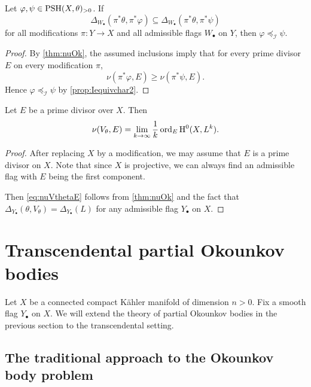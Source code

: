 \begin{corollary}\label{cor:Deltacontimplyvarphi}
	Let $\varphi,\psi\in \mathrm{PSH}(X,\theta)_{>0}$. If
	\[
		\Delta_{W_{\bullet}}(\pi^*\theta,\pi^*\varphi)\subseteq \Delta_{W_{\bullet}}(\pi^*\theta,\pi^*\psi)
	\]
	for all modifications $\pi\colon Y\rightarrow X$ and all admissible flags $W_{\bullet}$ on $Y$, then $\varphi\preceq_{\mathcal{I}} \psi$.
\end{corollary}
\begin{proof}
    By \cref{thm:nuOk}, the assumed inclusions imply that for every prime divisor $E$ on every modification $\pi$,
    \[
    \nu(\pi^*\varphi,E)\geq \nu(\pi^*\psi,E).
    \]
    Hence $\varphi\preceq_{\mathcal{I}}\psi$ by \cref{prop:Iequivchar2}.
\end{proof}
\begin{corollary}\label{cor:numin}
	Let $E$ be a prime divisor over $X$. Then
	\begin{equation}\label{eq:nuVthetaE}
		\nu(V_{\theta},E)=\lim_{k\to\infty}\frac{1}{k}\operatorname{ord}_E \mathrm{H}^0(X,L^k).
	\end{equation}
\end{corollary}

\begin{proof}
    After replacing $X$ by a modification, we may assume that $E$ is a prime divisor on $X$.
    Note that since $X$ is projective, we can always find an admissible flag with $E$ being the first component.

	Then \eqref{eq:nuVthetaE} follows from \cref{thm:nuOk} and the fact that $\Delta_{Y_{\bullet}}(\theta,V_{\theta})=\Delta_{Y_{\bullet}}(L)$ for any admissible flag $Y_{\bullet}$ on $X$.
\end{proof}






\section{Transcendental partial Okounkov bodies}\label{sec:tpob}
Let $X$ be a connected compact Kähler manifold of dimension $n>0$.
Fix a smooth flag $Y_{\bullet}$ on $X$. We will extend the theory of partial Okounkov bodies in the previous section to the transcendental setting.

\subsection{The traditional approach to the Okounkov body problem}
\label{subsec:trad_approach}

